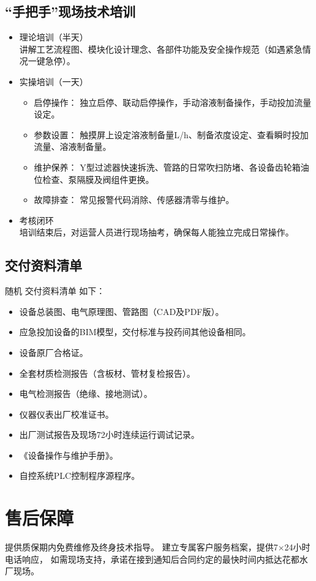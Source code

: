 \documentclass[UTF8,a4paper,12pt,titlepage]{ctexart}
\begin{document}
    \subsection{“手把手”现场技术培训}
    \begin{itemize}
        \item 理论培训（半天）\\
        讲解工艺流程图、模块化设计理念、各部件功能及安全操作规范（如遇紧急情况一键急停）。
        \item 实操培训（一天）\\
            \begin{itemize}
                \item 启停操作：
                独立启停、联动启停操作，手动溶液制备操作，手动投加流量设定。
                \item 参数设置：
                触摸屏上设定溶液制备量L/h、制备浓度设定、查看瞬时投加流量、溶液制备量。
                \item 维护保养：
                Y型过滤器快速拆洗、管路的日常吹扫防堵、各设备齿轮箱油位检查、泵隔膜及阀组件更换。
                \item 故障排查：
                常见报警代码消除、传感器清零与维护。
            \end{itemize}
        \item 考核闭环\\
        培训结束后，对运营人员进行现场抽考，确保每人能独立完成日常操作。
    \end{itemize}

    \subsection{交付资料清单}
    随机 交付资料清单 如下：
        \begin{itemize}
            \item 设备总装图、电气原理图、管路图（CAD及PDF版）。
            \item 应急投加设备的BIM模型，交付标准与投药间其他设备相同。
            \item 设备原厂合格证。
            \item 全套材质检测报告（含板材、管材复检报告）。
            \item 电气检测报告（绝缘、接地测试）。
            \item 仪器仪表出厂校准证书。
            \item 出厂测试报告及现场72小时连续运行调试记录。
            \item 《设备操作与维护手册》。
            \item 自控系统PLC控制程序源程序。
        \end{itemize}

\section{售后保障}
提供质保期内免费维修及终身技术指导。
建立专属客户服务档案，提供7×24小时电话响应，
如需现场支持，承诺在接到通知后合同约定的最快时间内抵达花都水厂现场。
\end{document}
